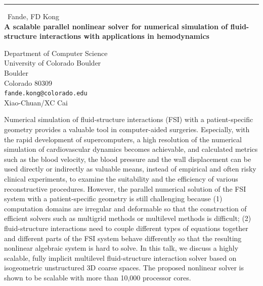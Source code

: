 \documentclass{report}
\begin{document}
\begin{center}
\rule{6in}{1pt} \
{\large Fande, FD Kong \\
{\bf A scalable parallel nonlinear solver for numerical simulation of fluid-structure interactions with applications in hemodynamics}}

Department of Computer Science \\ University of Colorado Boulder \\ Boulder \\ Colorado 80309
\\
{\tt fande.kong@colorado.edu}\\
Xiao-Chuan/XC Cai\end{center}

Numerical simulation of fluid-structure interactions (FSI) with a
patient-specific geometry provides a valuable tool in computer-aided
surgeries. Especially, with the rapid development of
supercomputers, a high resolution of the numerical simulation of cardiovascular dynamics
becomes achievable, and calculated metrics such as the blood velocity, the
blood pressure and the wall displacement can be used directly or indirectly as valuable
means, instead of empirical and often risky clinical experiments, to
examine the suitability
and the efficiency of various reconstructive procedures. However, the
parallel numerical solution of the FSI system with a patient-specific
geometry is still challenging
because (1) computation domains are irregular and deformable so that the
construction of efficient solvers such as
multigrid methods or multilevel methods is difficult; (2) fluid-structure
interactions need to couple different types of equations together
and different parts of the FSI system behave differently so that the
resulting nonlinear algebraic system is hard to solve.
In this talk, we discuss a highly scalable, fully implicit multilevel
fluid-structure interaction solver based on isogeometric unstructured 3D
coarse spaces. The proposed
nonlinear solver is shown to be scalable with more than 10,000 processor cores.
\end{document}
